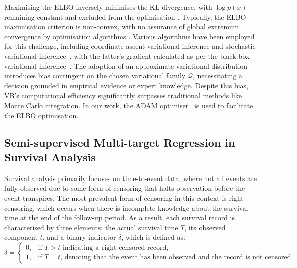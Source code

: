 \documentclass[3p,review,authoryear]{elsarticle}
\begin{document}
Maximising the ELBO inversely minimises the KL divergence, with $\log p(x)$ remaining constant and excluded from the optimisation .
Typically, the ELBO maximisation criterion is non-convex, with no assurance of global extremum convergence by optimisation algorithms .
Various algorithms have been employed for this challenge, including coordinate ascent variational inference and stochastic variational inference~\citep{hoffman2013stochastic}, with the latter's gradient calculated as per the black-box variational inference~\citep{sashank2018convergence}.
The adoption of an approximate variational distribution introduces bias  contingent on the chosen variational family $\mathcal{Q}$, necessitating a decision grounded in empirical evidence or expert knowledge.
Despite this bias, VB's computational efficiency significantly surpasses traditional methods like Monte Carlo integration.
In our work, the ADAM optimiser~\citep{kingma2014adam} is used to facilitate the ELBO optimisation.


\subsection{Semi-supervised Multi-target Regression in Survival Analysis}
Survival analysis primarily focuses on time-to-event data, where not all events are fully observed due to some form of censoring that halts observation before the event transpires.
The most prevalent form of censoring in this context is right-censoring, which occurs when there is incomplete knowledge about the survival time at the end of the follow-up period.
As a result, each survival record is characterised by three elements: the actual survival time $T$, its observed component $t$, and a binary indicator $\delta$, which is defined as:
\begin{equation}
\delta = \begin{cases}
0, & \text{if } T>t \text{ indicating a right-censored record},\\
1, & \text{if } T=t \text{, denoting that the event has been observed and the record is not censored}.
\end{cases}
\label{eq:delta}
\end{equation}
\end{document}
